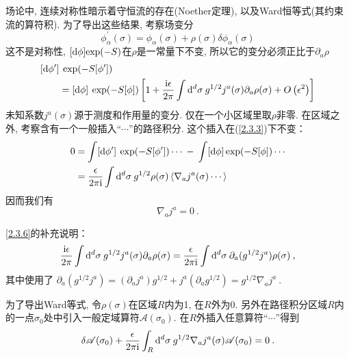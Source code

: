 场论中, 连续对称性暗示着守恒流的存在(Noether定理), 以及Ward恒等式(其约束流的算符积). 为了导出这些结果, 考察场变分
\begin{equation}\label{2.3.3}
\phi_{\alpha}^{\prime}(\sigma)=\phi_{\alpha}(\sigma)+\rho(\sigma) \delta \phi_{\alpha}(\sigma)
\end{equation}
这不是对称性, $[\mathrm{d} \phi]\mathrm{exp}(-S)$在$\rho$是一常量下不变, 所以它的变分必须正比于$\partial _a \rho$
\begin{align}
&[\mathrm{d} \phi^{\prime}]\: \exp (-S[\phi^{\prime}]) \nonumber \\
&\qquad=[\mathrm{d} \phi] \: \exp (-S[\phi])\left[1+\frac{\mathrm{i} \epsilon}{2 \pi} \int \mathrm{d}^{d} \sigma\: 
 g^{1 / 2} j^{a}(\sigma) \partial_{a} \rho(\sigma)+O\left(\epsilon^{2}\right)\right] \label{2.3.4}
\end{align}
未知系数$j^a(\sigma)$源于测度和作用量的变分. 仅在一个小区域里取$\rho$非零. 在区域之外, 考察含有一个一般插入``$\cdots$''的路径积分. 
这个插入在(\ref{2.3.3})下不变：
\begin{align}
0 &=\int[\mathrm{d} \phi^{\prime}]\: \exp (-S[\phi^{\prime}]) \cdots \: - \: \int[\mathrm{d} \phi] \exp (-S[\phi]) \cdots \nonumber \\
&=\frac{\epsilon}{2 \pi \mathrm{i}} \int \mathrm{d}^{d} \sigma \: g^{1 / 2} \rho(\sigma)\left\langle\nabla_{a} j^{a}(\sigma) \cdots\right\rangle
\label{2.3.5}
\end{align}
因而我们有
\begin{equation}
\nabla_{a} j^{a}=0 \:. \label{2.3.6}
\end{equation}
\begin{tcolorbox}
	\begin{remark}
		\eqref{2.3.6}的补充说明：
		\[
		\frac{\mathrm{i} \epsilon}{2 \pi} \int \mathrm{d} ^d \sigma\:g^{1 / 2} j^{a}(\sigma) \partial_{a} \rho(\sigma) 
		=\frac{\epsilon}{2 \pi \mathrm{i}} \int \mathrm{d}^{d} \sigma \: \partial_{a}(g^{1 / 2}j^{a})\rho(\sigma) \:,
		\]
		其中使用了 $\partial_{a}(g^{1 / 2} j^{a})=(\partial_{a} j^{a}) g^{1 / 2}+j^{a} (\partial_{a} g^{1 / 2})
		=g^{1 / 2}\nabla_{a}j^{a} \:$.
		\end{remark}	
\end{tcolorbox}

为了导出Ward等式, 令$\rho(\sigma)$在区域$R$内为1, 在$R$外为0. 另外在路径积分区域$R$内的一点$\sigma_{0}$处中引入一般定域算符$\mathscr{A}(\sigma_{0})$. 
在$R$外插入任意算符``$\cdots$''得到
\begin{equation} \label{2.3.7}
\delta \mathscr{A}(\sigma_{0})+\frac{\epsilon}{2 \pi \mathrm{i}} \int_{R} \mathrm{d}^{d} \sigma \: g^{1 / 2} \nabla_{a} j^{a}(\sigma) \mathscr{A}(\sigma_{0})=0 \:.
\end{equation}

